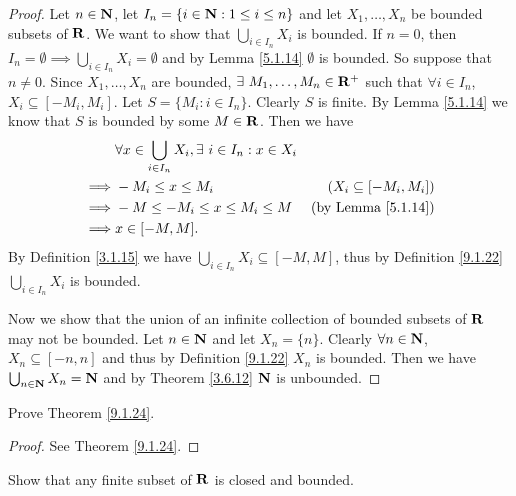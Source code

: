 \begin{proof}
    Let \(n \in \mathbf{N}\), let \(I_n = \{i \in \mathbf{N} : 1 \leq i \leq n\}\) and let \(X_1, \dots, X_n\) be bounded subsets of \(\mathbf{R}\).
    We want to show that \(\bigcup_{i \in I_n} X_i\) is bounded.
    If \(n = 0\), then \(I_n = \emptyset \implies \bigcup_{i \in I_n} X_i = \emptyset\) and by Lemma \ref{5.1.14} \(\emptyset\) is bounded.
    So suppose that \(n \neq 0\).
    Since \(X_1, \dots, X_n\) are bounded, \(\exists\ M_1, \dots, M_n \in \mathbf{R}^+\) such that \(\forall i \in I_n\), \(X_i \subseteq [-M_i, M_i]\).
    Let \(S = \{M_i : i \in I_n\}\).
    Clearly \(S\) is finite.
    By Lemma \ref{5.1.14} we know that \(S\) is bounded by some \(M \in \mathbf{R}\).
    Then we have
    \begin{align*}
                 & \forall x \in \bigcup_{i \in I_n} X_i, \exists\ i \in I_n : x \in X_i                                  \\
        \implies & -M_i \leq x \leq M_i                                                  & (X_i \subseteq [-M_i, M_i])    \\
        \implies & -M \leq -M_i \leq x \leq M_i \leq M                                   & \text{(by Lemma \ref{5.1.14})} \\
        \implies & x \in [-M, M].
    \end{align*}
    By Definition \ref{3.1.15} we have \(\bigcup_{i \in I_n} X_i \subseteq [-M, M]\), thus by Definition \ref{9.1.22} \(\bigcup_{i \in I_n} X_i\) is bounded.

    Now we show that the union of an infinite collection of bounded subsets of \(\mathbf{R}\) may not be bounded.
    Let \(n \in \mathbf{N}\) and let \(X_n = \{n\}\).
    Clearly \(\forall n \in \mathbf{N}\), \(X_n \subseteq [-n, n]\) and thus by Definition \ref{9.1.22} \(X_n\) is bounded.
    Then we have \(\bigcup_{n \in \mathbf{N}} X_n = \mathbf{N}\) and by Theorem \ref{3.6.12} \(\mathbf{N}\) is unbounded.
\end{proof}

\begin{exercise}\label{ex 9.1.13}
    Prove Theorem \ref{9.1.24}.
\end{exercise}

\begin{proof}
    See Theorem \ref{9.1.24}.
\end{proof}

\begin{exercise}\label{ex 9.1.14}
    Show that any finite subset of \(\mathbf{R}\) is closed and bounded.
\end{exercise}

